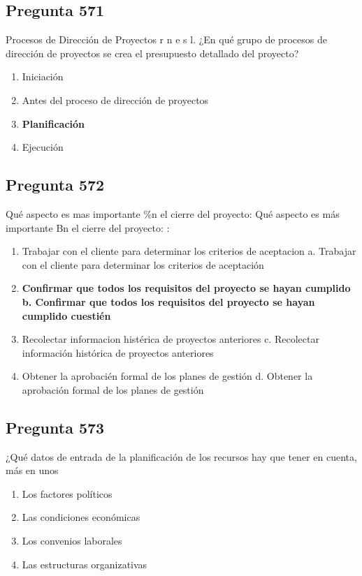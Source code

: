 \documentclass[11pt,a4paper]{article}
\begin{document}
\subsection*{Pregunta 571}
Procesos de Dirección de Proyectos r n e s l. ¿En qué grupo de procesos de dirección de proyectos se crea el presupuesto detallado del proyecto?

\begin{enumerate}[label=\alph*)]
  \item Iniciación
  \item Antes del proceso de dirección de proyectos
  \item \textbf{Planificación}
  \item Ejecución
\end{enumerate}

\subsection*{Pregunta 572}
Qué aspecto es mas importante \%n el cierre del proyecto: Qué aspecto es más importante Bn el cierre del proyecto: :

\begin{enumerate}[label=\alph*)]
  \item Trabajar con el cliente para determinar los criterios de aceptacion a. Trabajar con el cliente para determinar los criterios de aceptación
  \item \textbf{Confirmar que todos los requisitos del proyecto se hayan cumplido b. Confirmar que todos los requisitos del proyecto se hayan cumplido cuestién}
  \item Recolectar informacion histérica de proyectos anteriores c. Recolectar información histórica de proyectos anteriores
  \item Obtener la aprobacién formal de los planes de gestión d. Obtener la aprobación formal de los planes de gestión
\end{enumerate}

\subsection*{Pregunta 573}
¿Qué datos de entrada de la planificación de los recursos hay que tener en cuenta, más en unos

\begin{enumerate}[label=\alph*)]
  \item Los factores políticos
  \item Las condiciones económicas
  \item Los convenios laborales
  \item Las estructuras organizativas
\end{enumerate}
\end{document}
